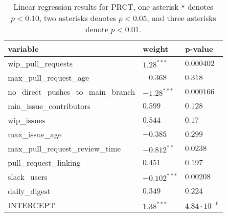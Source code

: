\renewcommand{\arraystretch}{1.2}
\begin{table}
\begin{center}
\begin{tabular}{|p{6cm}|p{3cm}|p{3cm}|} 
\hline
variable & weight & p-value \\ [0.5ex]
\hline\hline

wip\_pull\_requests & $1.28^{***}$ & $0.000402$ \\
max\_pull\_request\_age & $-0.368$ & $0.318$ \\
no\_direct\_pushes\_to\_main\_branch & $-1.28^{***}$ & $0.000166$ \\
min\_issue\_contributors & $0.599$ & $0.128$ \\
wip\_issues & $0.544$ & $0.17$ \\
max\_issue\_age & $-0.385$ & $0.299$ \\
max\_pull\_request\_review\_time & $-0.812^{**}$ & $0.0238$ \\
pull\_request\_linking & $0.451$ & $0.197$ \\
slack\_users & $-0.102^{***}$ & $0.00208$ \\
daily\_digest & $0.349$ & $0.224$ \\

\hline\hline
INTERCEPT & $1.38^{***}$ & $4.84\cdot10^{-6}$ \\ 

\hline
\end{tabular}
\caption{Linear regression results for PRCT, one asterisk \texttt{*} denotes  $p < 0.10$, two asterisks denotes $p < 0.05$, and three asterisks denote $p < 0.01$.}
\label{tab:lmResults}
\end{center}
\end{table}